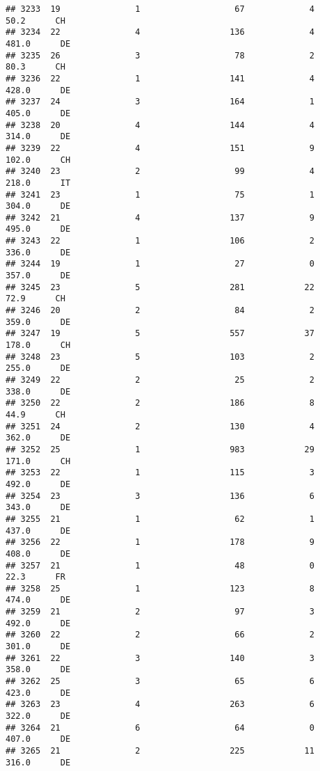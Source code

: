 \documentclass[
]{article}
\begin{document}
\begin{verbatim}
## 3233  19               1                   67             4     50.2      CH
## 3234  22               4                  136             4    481.0      DE
## 3235  26               3                   78             2     80.3      CH
## 3236  22               1                  141             4    428.0      DE
## 3237  24               3                  164             1    405.0      DE
## 3238  20               4                  144             4    314.0      DE
## 3239  22               4                  151             9    102.0      CH
## 3240  23               2                   99             4    218.0      IT
## 3241  23               1                   75             1    304.0      DE
## 3242  21               4                  137             9    495.0      DE
## 3243  22               1                  106             2    336.0      DE
## 3244  19               1                   27             0    357.0      DE
## 3245  23               5                  281            22     72.9      CH
## 3246  20               2                   84             2    359.0      DE
## 3247  19               5                  557            37    178.0      CH
## 3248  23               5                  103             2    255.0      DE
## 3249  22               2                   25             2    338.0      DE
## 3250  22               2                  186             8     44.9      CH
## 3251  24               2                  130             4    362.0      DE
## 3252  25               1                  983            29    171.0      CH
## 3253  22               1                  115             3    492.0      DE
## 3254  23               3                  136             6    343.0      DE
## 3255  21               1                   62             1    437.0      DE
## 3256  22               1                  178             9    408.0      DE
## 3257  21               1                   48             0     22.3      FR
## 3258  25               1                  123             8    474.0      DE
## 3259  21               2                   97             3    492.0      DE
## 3260  22               2                   66             2    301.0      DE
## 3261  22               3                  140             3    358.0      DE
## 3262  25               3                   65             6    423.0      DE
## 3263  23               4                  263             6    322.0      DE
## 3264  21               6                   64             0    407.0      DE
## 3265  21               2                  225            11    316.0      DE

\end{verbatim}
\end{document}
